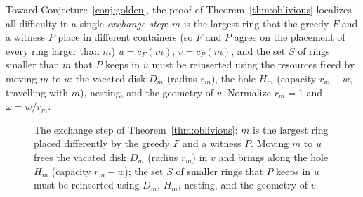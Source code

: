 \documentclass[11pt]{article}
\theoremstyle{definition}
\begin{document}
Toward Conjecture~\ref{conj:golden}, the proof of
Theorem~\ref{thm:oblivious} localizes all difficulty in a single
\emph{exchange step}: $m$ is the largest ring that the greedy $F$ and a
witness $P$ place in different containers (so $F$ and $P$ agree
on the placement of every ring larger than $m$) $u=c_F(m)$, $v=c_P(m)$, and the set
$S$ of rings smaller than $m$ that $P$ keeps in $u$ must be reinserted using
the resources freed by moving $m$ to $u$: the vacated disk $D_m$ (radius
$r_m$), the hole $H_m$ (capacity $r_m-w$, travelling with $m$), nesting, and
the geometry of $v$. Normalize $r_m=1$ and $\omega=w/r_m$.
\begin{figure}[ht]
\centering
{}
\caption{The exchange step of Theorem~\ref{thm:oblivious}: $m$ is the
largest ring placed differently by the greedy $F$ and a witness $P$.
Moving $m$ to $u$ frees the vacated disk $D_m$ (radius $r_m$) in $v$
and brings along the hole $H_m$ (capacity $r_m-w$); the set $S$ of
smaller rings that $P$ keeps in $u$ must be reinserted using $D_m$,
$H_m$, nesting, and the geometry of $v$.}
\label{fig:exchange}
\end{figure}
\end{document}
